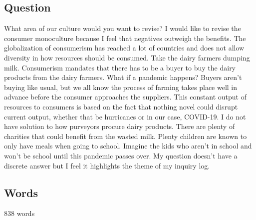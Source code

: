 \documentclass[a4paper,man,biblatex]{apa6}
\begin{document}
\subsection{Question} What area of our culture would you want to revise? I would like to revise the consumer monoculture because I feel that negatives outweigh the benefits. The globalization of consumerism has reached a lot of countries and does not allow diversity in how resources should be consumed. Take the dairy farmers dumping milk. Consumerism mandates that there has to be a buyer to buy the dairy products from the dairy farmers. What if a pandemic happens? Buyers aren't buying like usual, but we all know the process of farming takes place well in advance before the consumer approaches the suppliers. This constant output of resources to consumers is based on the fact that nothing novel could disrupt current output, whether that be hurricanes or in our case, COVID-19. I do not have solution to how purveyors procure dairy products. There are plenty of charities that could benefit from the wasted milk. Plenty children are known to only have meals when going to school. Imagine the kids who aren't in school and won't be school until this pandemic passes over. My question doesn't have a discrete answer but I feel it highlights the theme of my inquiry log. 

\subsection{Words} 838 words

\printbibliography
\end{document}
